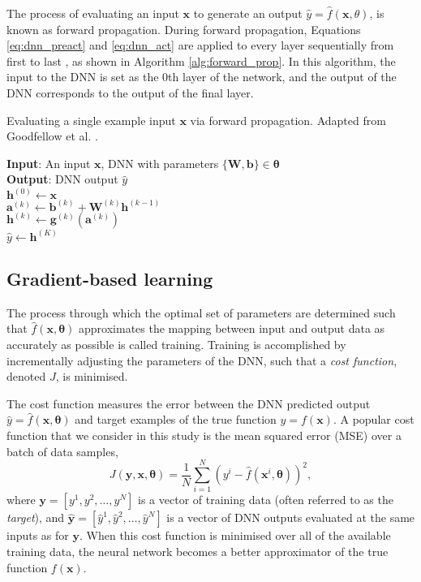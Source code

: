 The process of evaluating an input $\bm{x}$ to generate an output $\hat{y} = \hat{f}(\bm{x},\theta)$, is known as forward propagation.
During forward propagation, Equations \ref{eq:dnn_preact} and \ref{eq:dnn_act} are applied to every layer sequentially from first to last \cite{Goodfellow2016}, 
as shown in Algorithm \ref{alg:forward_prop}.
In this algorithm, the input to the DNN is set as the 0th layer of the network, and the output of the DNN corresponds to the output of the final layer.

\begin{algorithm}[htb!]
\caption[Evaluating a single example input via forward propagation]{Evaluating a single example input $\bm{x}$ via forward propagation. Adapted from Goodfellow et al. \cite{Goodfellow2016}.}
\label{alg:forward_prop}
\nonl\textbf{Input}: An input $\bm{x}$, DNN with parameters $\{\mathbf{W,b}\} \in \bm{\theta}$ \\
\nonl\textbf{Output}: DNN output $\hat{y}$ \\
\vspace{0.3cm} 
$\mathbf{h}^{(0)} \leftarrow \bm{x}$ \\
{
    $\mathbf{a}^{(k)} \leftarrow \mathbf{b}^{(k)} + \mathbf{W}^{(k)} \mathbf{h}^{(k-1)}$ \\
    $\mathbf{h}^{(k)} \leftarrow \mathbf{g}^{(k)}(\mathbf{a}^{(k)})$ \\
}
$\hat{y} \leftarrow \mathbf{h}^{(K)}$ \\
\end{algorithm}



\subsection{Gradient-based learning}\label{sec:grad_des}
The process through which the optimal set of parameters are determined such that $\hat{f}(\bm{x}, \bm{\theta})$ approximates the mapping between 
input and output data as accurately as possible is called training.
Training is accomplished by incrementally adjusting the parameters of the DNN, such that a \emph{cost function}, denoted $J$, is minimised. 

The cost function measures the error between the DNN predicted output $\hat{y} = \hat{f}(\bm{x}, \bm{\theta})$ and target examples of the true function $y = f(\bm{x})$. 
A popular cost  function that we consider in this study is the mean squared error (MSE) over a batch of data samples,
\begin{equation}
    J( \bm{y}, \bm{x}, \bm{\theta}) = \frac{1}{N} \sum_{i=1}^{N} (y^i - \hat{f}(\bm{x}^i, \bm{\theta}))^2,
    \label{eq:cost_function}
\end{equation}
where $\mathbf{y} = [ y^1, y^2, \ldots , y^N ]$ is a vector of training data (often referred to as the \emph{target}), and $\mathbf{\hat{y}} = [ \hat{y}^1, \hat{y}^2, \ldots , \hat{y}^N ]$ is a vector of DNN outputs evaluated at the same inputs as for $\mathbf{y}$.
When this cost function is minimised over all of the available training data, the neural network becomes a better approximator of the true function $f(\bm{x})$.


